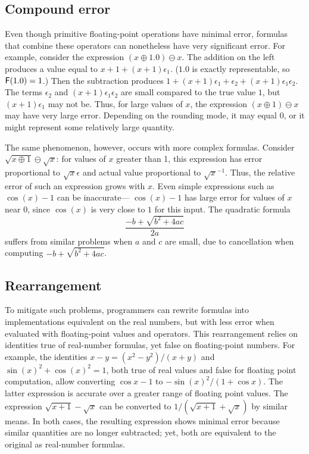 \documentclass[paper.tex]{subfiles}
\begin{document}
\subsection{Compound error}

Even though primitive floating-point operations have minimal error,
  formulas that combine these operators can nonetheless
  have very significant error.
For example, consider the expression $(x \oplus 1.0) \ominus x$.
The addition on the left produces a value equal to
  $x + 1 + (x + 1)\epsilon_1$.
($1.0$ is exactly representable, so $\mathsf{F}(1.0) = 1$.)
Then the subtraction produces
  $1 + (x + 1) \epsilon_1 + \epsilon_2  + (x + 1) \epsilon_1 \epsilon_2$.
The terms $\epsilon_2$ and $(x+1)\epsilon_1\epsilon_2$ are small
  compared to the true value $1$,
  but $(x + 1) \epsilon_1$ may not be.
Thus, for large values of $x$,
  the expression $(x \oplus 1) \ominus x$ may have very large error.
Depending on the rounding mode, it may equal $0$,
  or it might represent some relatively large quantity.

The same phenomenon, however, occurs with more complex formulas.
Consider $\sqrt{x \oplus 1} \ominus \sqrt{x}$:
  for values of $x$ greater than 1, this expression
  has error proportional to $\sqrt{x} \epsilon$
  and actual value proportional to $\sqrt{x}^{-1}$.
Thus, the relative error of such an expression grows with $x$.
Even simple expressions such as $\cos(x) - 1$ can be inaccurate---%
  $\cos(x) - 1$ has large error for values of $x$ near 0,
  since $\cos(x)$ is very close to $1$ for this input.
The quadratic formula \[\frac{-b + \sqrt{b^2 + 4 a c}}{2 a}\]
  suffers from similar problems when $a$ and $c$ are small,
  due to cancellation when computing $-b + \sqrt{b^2 + 4 a c}$.

\subsection{Rearrangement}

To mitigate such problems, programmers can rewrite formulas
  into implementations equivalent on the real numbers,
  but with less error when evaluated
  with floating-point values and operators.
This rearrangement relies on identities
  true of real-number formulas,
  yet false on floating-point numbers.
For example, the identities $x - y = (x^2 - y^2) / (x + y)$
  and $\sin(x)^2 + \cos(x)^2 = 1$,
  both true of real values and false for floating point computation,
  allow converting $\cos x - 1$ to $- \sin(x)^2 / (1 + \cos x)$.
The latter expression is accurate over
  a greater range of floating point values.
The expression $\sqrt{x+1} - \sqrt{x}$ can be converted
  to $1 / (\sqrt{x+1} + \sqrt{x})$ by similar means.
In both cases, the resulting expression shows minimal error
  because similar quantities are no longer subtracted;
  yet, both are equivalent to the original as real-number formulas.
\end{document}

